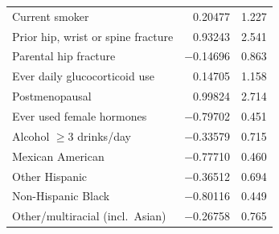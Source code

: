\documentclass[11pt,a4paper]{article}
\begin{document}
\begin{longtable}{lrr}
Current smoker & 0.20477 & 1.227 \\
Prior hip, wrist or spine fracture & 0.93243 & 2.541 \\
Parental hip fracture & $-$0.14696 & 0.863 \\
Ever daily glucocorticoid use & 0.14705 & 1.158 \\
Postmenopausal & 0.99824 & 2.714 \\
Ever used female hormones & $-$0.79702 & 0.451 \\
Alcohol $\ge$3 drinks/day & $-$0.33579 & 0.715 \\
Mexican American & $-$0.77710 & 0.460 \\
Other Hispanic & $-$0.36512 & 0.694 \\
Non-Hispanic Black & $-$0.80116 & 0.449 \\
Other/multiracial (incl.\ Asian) & $-$0.26758 & 0.765 \\
\end{longtable}
\end{document}
